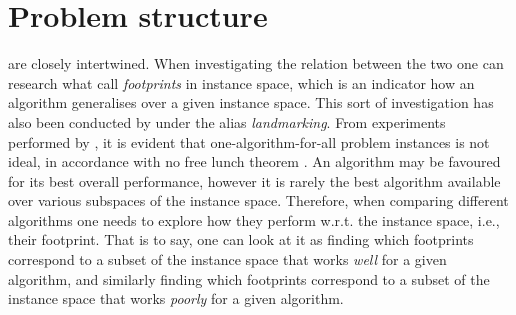 
\chapter{Problem structure}\label{ch:problemstructure} 



 are closely intertwined. When investigating the relation between the two one can research what \citet{Corne10} call \emph{footprints} in instance space, which is an indicator how an algorithm generalises over a given instance space. This sort of investigation has also been conducted by \citet{Pfahringer00} under the alias \emph{landmarking}. 
From experiments performed by \citeauthor{Corne10}, it is evident that one-algorithm-for-all problem instances is not ideal, in accordance with no free lunch theorem \citep{Wolpert97nofree}. An algorithm may be favoured for its best overall performance, however it is rarely the best algorithm available over various subspaces of the instance space.
Therefore, when comparing different algorithms one needs to explore how they perform w.r.t. the instance space, i.e., their footprint. That is to say, one can look at it as finding which footprints correspond to a subset of the instance space that works \emph{well} for a given algorithm, and similarly finding which footprints correspond to a subset of the instance space that works \emph{poorly} for a given algorithm. 

